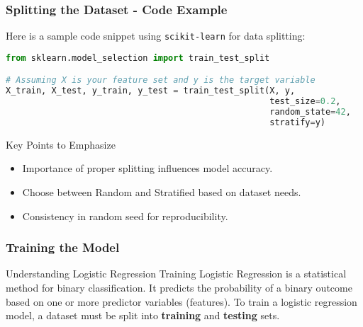 \documentclass[aspectratio=169]{beamer}
\begin{document}
\begin{frame}[fragile]
  \frametitle{Splitting the Dataset - Code Example}
  Here is a sample code snippet using \texttt{scikit-learn} for data splitting:
  
  \begin{lstlisting}[language=Python]
from sklearn.model_selection import train_test_split

# Assuming X is your feature set and y is the target variable
X_train, X_test, y_train, y_test = train_test_split(X, y, 
                                                    test_size=0.2, 
                                                    random_state=42, 
                                                    stratify=y)
  \end{lstlisting}

  \begin{block}{Key Points to Emphasize}
    \begin{itemize}
      \item Importance of proper splitting influences model accuracy.
      \item Choose between Random and Stratified based on dataset needs.
      \item Consistency in random seed for reproducibility.
    \end{itemize}
  \end{block}
\end{frame}

\begin{frame}[fragile]
    \frametitle{Training the Model}
    \begin{block}{Understanding Logistic Regression Training}
        Logistic Regression is a statistical method for binary classification. It predicts the probability of a binary outcome based on one or more predictor variables (features). 
        To train a logistic regression model, a dataset must be split into \textbf{training} and \textbf{testing} sets.
    \end{block}
\end{frame}
\end{document}
